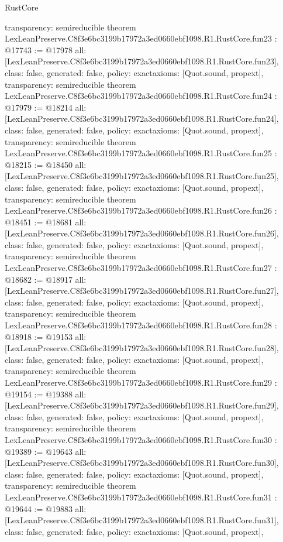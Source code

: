 \begin{lexlean}{RustCore}
\begin{coremodule}
{  transparency: semireducible
}
theorem LexLeanPreserve.C8f3e6bc3199b17972a3ed0660ebf1098.R1.RustCore.fun23 : @17743 := @17978 {
  all: [LexLeanPreserve.C8f3e6bc3199b17972a3ed0660ebf1098.R1.RustCore.fun23],
  class: false,
  generated: false,
  policy: exact{axioms: [Quot.sound, propext]},
  transparency: semireducible
}
theorem LexLeanPreserve.C8f3e6bc3199b17972a3ed0660ebf1098.R1.RustCore.fun24 : @17979 := @18214 {
  all: [LexLeanPreserve.C8f3e6bc3199b17972a3ed0660ebf1098.R1.RustCore.fun24],
  class: false,
  generated: false,
  policy: exact{axioms: [Quot.sound, propext]},
  transparency: semireducible
}
theorem LexLeanPreserve.C8f3e6bc3199b17972a3ed0660ebf1098.R1.RustCore.fun25 : @18215 := @18450 {
  all: [LexLeanPreserve.C8f3e6bc3199b17972a3ed0660ebf1098.R1.RustCore.fun25],
  class: false,
  generated: false,
  policy: exact{axioms: [Quot.sound, propext]},
  transparency: semireducible
}
theorem LexLeanPreserve.C8f3e6bc3199b17972a3ed0660ebf1098.R1.RustCore.fun26 : @18451 := @18681 {
  all: [LexLeanPreserve.C8f3e6bc3199b17972a3ed0660ebf1098.R1.RustCore.fun26],
  class: false,
  generated: false,
  policy: exact{axioms: [Quot.sound, propext]},
  transparency: semireducible
}
theorem LexLeanPreserve.C8f3e6bc3199b17972a3ed0660ebf1098.R1.RustCore.fun27 : @18682 := @18917 {
  all: [LexLeanPreserve.C8f3e6bc3199b17972a3ed0660ebf1098.R1.RustCore.fun27],
  class: false,
  generated: false,
  policy: exact{axioms: [Quot.sound, propext]},
  transparency: semireducible
}
theorem LexLeanPreserve.C8f3e6bc3199b17972a3ed0660ebf1098.R1.RustCore.fun28 : @18918 := @19153 {
  all: [LexLeanPreserve.C8f3e6bc3199b17972a3ed0660ebf1098.R1.RustCore.fun28],
  class: false,
  generated: false,
  policy: exact{axioms: [Quot.sound, propext]},
  transparency: semireducible
}
theorem LexLeanPreserve.C8f3e6bc3199b17972a3ed0660ebf1098.R1.RustCore.fun29 : @19154 := @19388 {
  all: [LexLeanPreserve.C8f3e6bc3199b17972a3ed0660ebf1098.R1.RustCore.fun29],
  class: false,
  generated: false,
  policy: exact{axioms: [Quot.sound, propext]},
  transparency: semireducible
}
theorem LexLeanPreserve.C8f3e6bc3199b17972a3ed0660ebf1098.R1.RustCore.fun30 : @19389 := @19643 {
  all: [LexLeanPreserve.C8f3e6bc3199b17972a3ed0660ebf1098.R1.RustCore.fun30],
  class: false,
  generated: false,
  policy: exact{axioms: [Quot.sound, propext]},
  transparency: semireducible
}
theorem LexLeanPreserve.C8f3e6bc3199b17972a3ed0660ebf1098.R1.RustCore.fun31 : @19644 := @19883 {
  all: [LexLeanPreserve.C8f3e6bc3199b17972a3ed0660ebf1098.R1.RustCore.fun31],
  class: false,
  generated: false,
  policy: exact{axioms: [Quot.sound, propext]},
}
\end{coremodule}
\end{lexlean}
